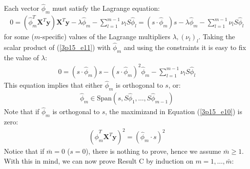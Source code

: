 \noindent Each vector $\hat{\phi}_m$ must satisfy the Lagrange equation:
\begin{eqnarray} \label{3p15_e11}
0 = \left( \hat{\phi}_m^T \mathbf{X}^T \mathbf{y} \right) \mathbf{X}^T \mathbf{y} - \lambda \hat{\phi}_m - \sum_{l = 1}^{m - 1} \nu_l S \hat{\phi}_l = (s \cdot \hat{\phi}_m) s - \lambda \hat{\phi}_m - \sum_{l = 1}^{m - 1} \nu_l S \hat{\phi}_l
\end{eqnarray}
for some ($m$-specific) values of the Lagrange multipliers $\lambda, (\nu_l)_l$. Taking the scalar
product of (\ref{3p15_e11}) with $\hat{\phi}_m$ and using the constraints it is easy to fix the value
of $\lambda$:
\begin{eqnarray*}
    0 = (s \cdot \hat{\phi}_m) s -  (s \cdot \hat{\phi}_m)^2 \hat{\phi}_m - \sum_{l = 1}^{m - 1} \nu_l S \hat{\phi}_l
\end{eqnarray*}
This equation implies that either $\hat{\phi}_m$ is orthogonal to $s$, or:
\begin{eqnarray} \label{3p15_span}
\hat{\phi}_m \in \textrm{Span} \left( s, S \hat{\phi}_1, \ldots, S \hat{\phi}_{m - 1}  \right)
\end{eqnarray}
Note that if $\hat{\phi}_m$ is orthogonal to $s$, the maximizand in Equation (\ref{3p15_e10}) is
zero:
\begin{eqnarray*}
    \left( \hat{\phi}_m^T \mathbf{X}^T \mathbf{y} \right)^2 = \left(\hat{\phi}_m \cdot s  \right)^2
\end{eqnarray*}
Notice that if $\bar{m} = 0$ ($s = 0$), there is nothing to prove, hence we assume $\bar{m} \geq 1$.
With this in mind, we can now prove Result C by induction on $m = 1, \ldots, \bar{m}$:
